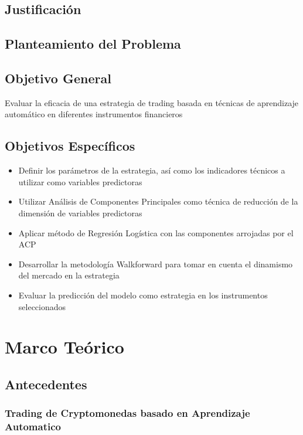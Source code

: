 \documentclass[a4paper,12pt]{Latex/Classes/PhDthesisPSnPDF}
\begin{document}
\section{Justificación}


\section{Planteamiento del Problema}


\section{Objetivo General}

Evaluar la eficacia de una estrategia de trading basada en técnicas de aprendizaje automático en diferentes instrumentos financieros

\section{Objetivos Específicos}

\begin{itemize}
\item Definir los parámetros de la estrategia, así como los indicadores técnicos a utilizar como variables predictoras
\item Utilizar Análisis de Componentes Principales como técnica de reducción de la dimensión de variables predictoras
\item Aplicar método de Regresión Logística con las componentes arrojadas por el ACP
\item Desarrollar la metodología Walkforward para tomar en cuenta el dinamismo del mercado en la estrategia
\item Evaluar la predicción del modelo como estrategia en los instrumentos seleccionados
\end{itemize}


\chapter{Marco Teórico}

\section{Antecedentes}

\subsection{Trading de Cryptomonedas basado en Aprendizaje Automatico}
\end{document}
